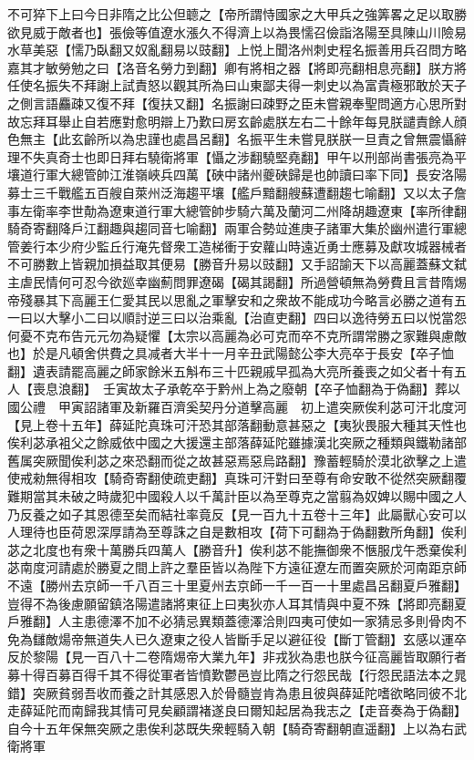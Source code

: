 不可猝下上曰今日非隋之比公但聼之【帝所謂恃國家之大甲兵之強筭畧之足以取勝欲見威于敵者也】張儉等值遼水漲久不得濟上以為畏懦召儉詣洛陽至具陳山川險易水草美惡【懦乃臥翻又奴亂翻易以豉翻】上悦上聞洛州刺史程名振善用兵召問方略嘉其才敏勞勉之曰【洛音名勞力到翻】卿有將相之器【將即亮翻相息亮翻】朕方將任使名振失不拜謝上試責怒以觀其所為曰山東鄙夫得一刺史以為富貴極邪敢於天子之側言語麤疎又復不拜【復扶又翻】名振謝曰疎野之臣未嘗親奉聖問適方心思所對故忘拜耳舉止自若應對愈明辯上乃歎曰房玄齡處朕左右二十餘年每見朕譴責餘人顔色無主【此玄齡所以為忠謹也處昌呂翻】名振平生未嘗見朕朕一旦責之曾無震懾辭理不失真奇士也即日拜右驍衛將軍【懾之涉翻驍堅堯翻】甲午以刑部尚書張亮為平壤道行軍大總管帥江淮嶺峽兵四萬【硤中諸州夔硤歸是也帥讀曰率下同】長安洛陽募士三千戰艦五百艘自萊州泛海趨平壤【艦戶黯翻艘蘇遭翻趨七喻翻】又以太子詹事左衛率李世勣為遼東道行軍大總管帥步騎六萬及蘭河二州降胡趣遼東【率所律翻騎奇寄翻降戶江翻趣與趨同音七喻翻】兩軍合勢竝進庚子諸軍大集於幽州遣行軍總管姜行本少府少監丘行淹先督衆工造梯衝于安蘿山時遠近勇士應募及獻攻城器械者不可勝數上皆親加損益取其便易【勝音升易以豉翻】又手詔諭天下以高麗蓋蘇文弑主虐民情何可忍今欲廵幸幽薊問罪遼碣【碣其謁翻】所過營頓無為勞費且言昔隋焬帝殘暴其下高麗王仁愛其民以思亂之軍擊安和之衆故不能成功今略言必勝之道有五一曰以大擊小二曰以順討逆三曰以治乘亂【治直吏翻】四曰以逸待勞五曰以悦當怨何憂不克布告元元勿為疑懼【太宗以高麗為必可克而卒不克所謂常勝之家難與慮敵也】於是凡頓舍供費之具减者大半十一月辛丑武陽懿公李大亮卒于長安【卒子恤翻】遺表請罷高麗之師家餘米五斛布三十匹親戚早孤為大亮所養喪之如父者十有五人【喪息浪翻】　壬寅故太子承乾卒于黔州上為之廢朝【卒子恤翻為于偽翻】葬以國公禮　甲寅詔諸軍及新羅百濟奚契丹分道擊高麗　初上遣突厥俟利苾可汗北度河【見上卷十五年】薛延陀真珠可汗恐其部落翻動意甚惡之【夷狄畏服大種其天性也俟利苾承袓父之餘威依中國之大援還主部落薛延陀雖據漢北突厥之種類與鐵勒諸部舊属突厥聞俟利苾之來恐翻而從之故甚惡焉惡烏路翻】豫蓄輕騎於漠北欲擊之上遣使戒勑無得相攻【騎奇寄翻使疏吏翻】真珠可汗對曰至尊有命安敢不從然突厥翻覆難期當其未破之時歲犯中國殺人以千萬計臣以為至尊克之當翦為奴婢以賜中國之人乃反養之如子其恩德至矣而結社率竟反【見一百九十五卷十三年】此屬獸心安可以人理待也臣荷恩深厚請為至尊誅之自是數相攻【荷下可翻為于偽翻數所角翻】俟利苾之北度也有衆十萬勝兵四萬人【勝音升】俟利苾不能撫御衆不愜服戊午悉棄俟利苾南度河請處於勝夏之間上許之羣臣皆以為陛下方遠征遼左而置突厥於河南距京師不遠【勝州去京師一千八百三十里夏州去京師一千一百一十里處昌呂翻夏戶雅翻】豈得不為後慮願留鎮洛陽遣諸將東征上曰夷狄亦人耳其情與中夏不殊【將即亮翻夏戶雅翻】人主患德澤不加不必猜忌異類蓋德澤洽則四夷可使如一家猜忌多則骨肉不免為讎敵煬帝無道失人已久遼東之役人皆斷手足以避征役【斷丁管翻】玄感以運卒反於黎陽【見一百八十二卷隋焬帝大業九年】非戎狄為患也朕今征高麗皆取願行者募十得百募百得千其不得從軍者皆憤歎鬱邑豈比隋之行怨民哉【行怨民語法本之晁錯】突厥貧弱吾收而養之計其感恩入於骨髓豈肯為患且彼與薛延陀嗜欲略同彼不北走薛延陀而南歸我其情可見矣顧謂褚遂良曰爾知起居為我志之【走音奏為于偽翻】自今十五年保無突厥之患俟利苾既失衆輕騎入朝【騎奇寄翻朝直遥翻】上以為右武衛將軍

